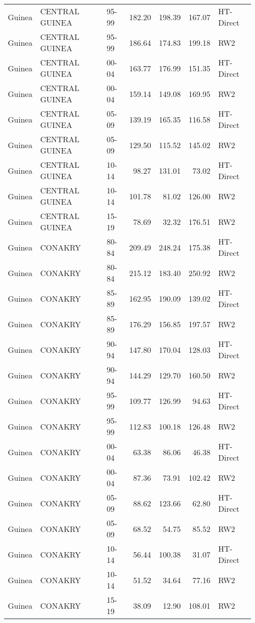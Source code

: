 \begin{longtable}{lllrrrl}
  Guinea & CENTRAL GUINEA & 95-99 & 182.20 & 198.39 & 167.07 & HT-Direct \\ 
  Guinea & CENTRAL GUINEA & 95-99 & 186.64 & 174.83 & 199.18 & RW2 \\ 
  Guinea & CENTRAL GUINEA & 00-04 & 163.77 & 176.99 & 151.35 & HT-Direct \\ 
  Guinea & CENTRAL GUINEA & 00-04 & 159.14 & 149.08 & 169.95 & RW2 \\ 
  Guinea & CENTRAL GUINEA & 05-09 & 139.19 & 165.35 & 116.58 & HT-Direct \\ 
  Guinea & CENTRAL GUINEA & 05-09 & 129.50 & 115.52 & 145.02 & RW2 \\ 
  Guinea & CENTRAL GUINEA & 10-14 & 98.27 & 131.01 & 73.02 & HT-Direct \\ 
  Guinea & CENTRAL GUINEA & 10-14 & 101.78 & 81.02 & 126.00 & RW2 \\ 
  Guinea & CENTRAL GUINEA & 15-19 & 78.69 & 32.32 & 176.51 & RW2 \\ 
  Guinea & CONAKRY & 80-84 & 209.49 & 248.24 & 175.38 & HT-Direct \\ 
  Guinea & CONAKRY & 80-84 & 215.12 & 183.40 & 250.92 & RW2 \\ 
  Guinea & CONAKRY & 85-89 & 162.95 & 190.09 & 139.02 & HT-Direct \\ 
  Guinea & CONAKRY & 85-89 & 176.29 & 156.85 & 197.57 & RW2 \\ 
  Guinea & CONAKRY & 90-94 & 147.80 & 170.04 & 128.03 & HT-Direct \\ 
  Guinea & CONAKRY & 90-94 & 144.29 & 129.70 & 160.50 & RW2 \\ 
  Guinea & CONAKRY & 95-99 & 109.77 & 126.99 & 94.63 & HT-Direct \\ 
  Guinea & CONAKRY & 95-99 & 112.83 & 100.18 & 126.48 & RW2 \\ 
  Guinea & CONAKRY & 00-04 & 63.38 & 86.06 & 46.38 & HT-Direct \\ 
  Guinea & CONAKRY & 00-04 & 87.36 & 73.91 & 102.42 & RW2 \\ 
  Guinea & CONAKRY & 05-09 & 88.62 & 123.66 & 62.80 & HT-Direct \\ 
  Guinea & CONAKRY & 05-09 & 68.52 & 54.75 & 85.52 & RW2 \\ 
  Guinea & CONAKRY & 10-14 & 56.44 & 100.38 & 31.07 & HT-Direct \\ 
  Guinea & CONAKRY & 10-14 & 51.52 & 34.64 & 77.16 & RW2 \\ 
  Guinea & CONAKRY & 15-19 & 38.09 & 12.90 & 108.01 & RW2 \\ 

\end{longtable}

